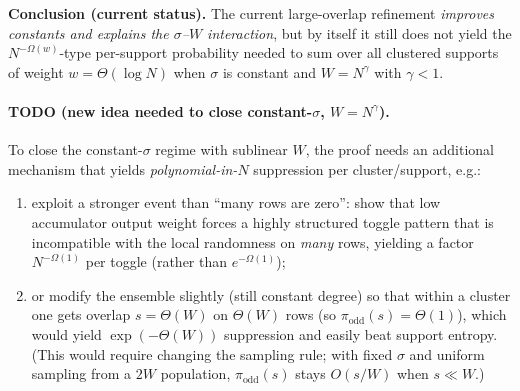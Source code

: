 \noindent\textbf{Conclusion (current status).}
The current large-overlap refinement \emph{improves constants and explains the $\sigma$--$W$ interaction},
but by itself it still does not yield the $N^{-\Omega(w)}$-type per-support probability needed to sum over all
clustered supports of weight $w=\Theta(\log N)$ when $\sigma$ is constant and $W=N^\gamma$ with $\gamma<1$.

\paragraph{TODO (new idea needed to close constant-$\sigma$, $W=N^\gamma$).}
To close the constant-$\sigma$ regime with sublinear $W$, the proof needs an additional mechanism that yields
\emph{polynomial-in-$N$} suppression per cluster/support, e.g.:
\begin{enumerate}
\item exploit a stronger event than ``many rows are zero'': show that low accumulator output weight forces
      a highly structured toggle pattern that is incompatible with the local randomness on \emph{many} rows,
      yielding a factor $N^{-\Omega(1)}$ per toggle (rather than $e^{-\Omega(1)}$);
\item or modify the ensemble slightly (still constant degree) so that within a cluster one gets overlap
      $s=\Theta(W)$ on $\Theta(W)$ rows (so $\pi_{\mathrm{odd}}(s)=\Theta(1)$), which would yield
      $\exp(-\Theta(W))$ suppression and easily beat support entropy.
      (This would require changing the sampling rule; with fixed $\sigma$ and uniform sampling from a $2W$ population,
      $\pi_{\mathrm{odd}}(s)$ stays $O(s/W)$ when $s\ll W$.)
\end{enumerate}



%
%

